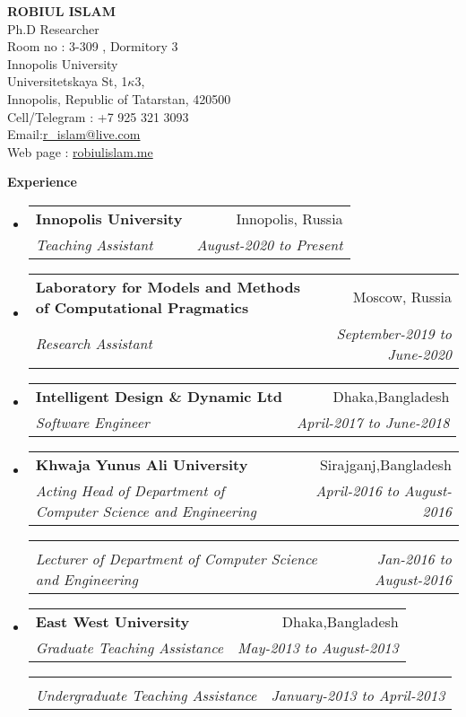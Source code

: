 \documentclass[letterpaper,10pt]{article}
\makeatletter
\newcommand{\resheading}[1]{{\large \colorbox{mygrey}{\begin{minipage}{\textwidth}{\textbf{#1 \vphantom{p\^{E}}}}\end{minipage}}}}
\newcommand{\ressubheading}[4]{
\begin{tabular*}{6.5in}{l@{\extracolsep{\fill}}r}
		\textbf{#1} & #2 \\
		\textit{#3} & \textit{#4} \\
\end{tabular*}\vspace{-6pt}}
\makeatother
\begin{document}
\textbf{ROBIUL ISLAM }  \\ 
Ph.D Researcher \\ 
Room no : 3-309 , Dormitory 3 \\ 
Innopolis University \\ 
Universitetskaya St, 1$\kappa$3, \\
Innopolis, Republic of Tatarstan, 420500 \\

Cell/Telegram : +7 925 321 3093 \\
Email:\href{mailto:r\_islam@live.com}{r\_islam@live.com} \\
Web page : \url{robiulislam.me} 



\vspace{0.1in}


\vspace{0.1in}
\resheading{Experience}
\begin{itemize}

\item

\ressubheading{Innopolis University}{Innopolis, Russia}{Teaching Assistant}{August-2020 to Present}
\item

\ressubheading{Laboratory for Models and Methods of Computational Pragmatics}{Moscow, Russia}{Research Assistant}{September-2019 to June-2020}

\item

\ressubheading{Intelligent Design \& Dynamic Ltd}{Dhaka,Bangladesh}{Software Engineer}{April-2017 to June-2018}
\item
\ressubheading{Khwaja Yunus Ali University}{Sirajganj,Bangladesh}{Acting Head of Department of Computer Science and Engineering}{April-2016 to August-2016}
\ressubheading{ }{}{Lecturer of Department of Computer Science and Engineering}{Jan-2016 to August-2016 }

\item
	\ressubheading{East West University}{Dhaka,Bangladesh}{Graduate Teaching Assistance }{May-2013 to August-2013 }
\ressubheading{}{}{Undergraduate Teaching Assistance}{January-2013 to April-2013}	
\end{itemize}
\end{document}
